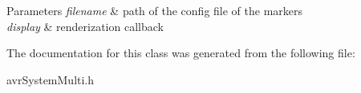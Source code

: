 \begin{DoxyParams}{Parameters}
{\em filename} & path of the config file of the markers \\
\hline
{\em display} & renderization callback \\
\hline
\end{DoxyParams}


The documentation for this class was generated from the following file\-:\begin{DoxyCompactItemize}
\item 
avr\-System\-Multi.\-h\end{DoxyCompactItemize}
